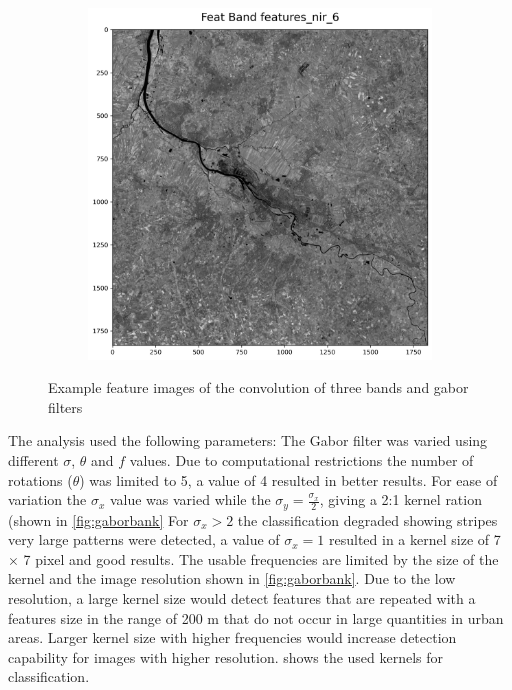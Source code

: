 \documentclass[12pt,a4paper, english,twoside]{article}
\begin{document}
\begin{figure}[!htbp]
\begin{subfigure}[b]{0.3\textwidth}
      \end{subfigure}
      \begin{subfigure}[b]{0.3\textwidth}
        \includegraphics[width=\textwidth]{img/Features_nir_6.png}
      \end{subfigure}
     \caption{Example feature images of the convolution of three bands and gabor filters\label{fig:gaborresults}}
    \end{figure}    
    \noindent
      The analysis used the following parameters: 
      The Gabor filter was varied using different $\sigma$, $\theta$ and $f$ values.
      Due to computational restrictions the number of rotations ($\theta$) was limited to 5, a value of 4 resulted in better results. 
      For ease of variation the $\sigma_x$ value was varied while the $\sigma_y = \frac{\sigma_x}{2}$, giving a 2:1 kernel ration (shown in \cref{fig:gaborbank} 
      For $\sigma_x > 2$ the classification degraded showing stripes very large patterns were detected, a value of $\sigma_x = 1$ resulted in a kernel size of 7 $\times$ 7 pixel and good results.
%
      The usable frequencies are limited by the size of the kernel and the image resolution shown in \cref{fig:gaborbank}.
      Due to the low resolution, a large kernel size would detect features that are repeated with a features size in the range of 200 m that do not occur in large quantities in urban areas. 
      Larger kernel size with higher frequencies would increase detection capability for images with higher resolution. 
     shows the used kernels for classification.
\end{document}
